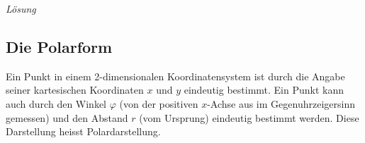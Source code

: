 \clearpage
\emph{Lösung}
\begin{center}
        
\end{center}





















\clearpage
\subsection{Die Polarform}

Ein Punkt in einem 2-dimensionalen Koordinatensystem ist durch die Angabe seiner kartesischen Koordinaten $x$ und $y$ eindeutig bestimmt. Ein Punkt kann auch durch den Winkel $\varphi$ (von der positiven $x$-Achse aus im Gegenuhrzeigersinn gemessen) und den Abstand $r$ (vom Ursprung) eindeutig bestimmt werden. Diese Darstellung heisst Polardarstellung.

